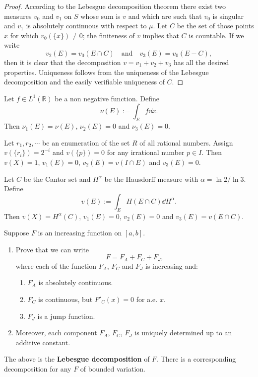 \begin{proof}
  According to the Lebesgue decomposition theorem there exist two measures $v_0$ and $v_1$ on $S$ 
  whose sum is $v$ and which are such that $v_0$ is singular 
  and $v_1$ is absolutely continuous with respect to $\mu$.
  Let $C$ be the set of those points $x$ for which $v_0(\{x\}) \neq 0$; the finiteness of $v$ implies that 
  $C$ is countable. If we write 
  \[
  v_2(E) = v_0(E\cap C) \quad \text{and}\quad v_3(E) = v_0(E-C),
  \]
  then it is clear that the decomposition $v = v_1 + v_2 + v_3$ has all the desired properties.
  Uniqueness follows from the uniqueness of the Lebesgue decomposition 
  and the easily verifiable uniqueness of $C$.
\end{proof}

\begin{example}
  Let $f\in L^1(\mathbb R)$ be a non negative function. 
  Define 
  \[
  \nu(E) := \int_Ef\dd x.
  \]
  Then $\nu_1(E) = \nu(E)$, $\nu_2(E) = 0$ and $\nu_3(E) = 0$.

  Let $r_1, r_2, \cdots$ be an enumeration of the set $R$ of all rational numbers. 
  Assign $v(\{r_i\}) = 2^{-i}$ and $v(\{p\}) = 0$ for any irrational number $p\in I$.
  Then $v(X) = 1$, $v_1(E) = 0$, $v_2(E) = v(I\cap E)$ and $v_3(E) = 0$.

  Let $C$ be the Cantor set and $H^{\alpha}$ be the Hausdorff measure with $\alpha=\ln 2/\ln3$.
  Define 
  \[
  v(E) := \int_E H(E\cap C)\dd H^\alpha.
  \]
  Then $v(X) = H^\alpha(C)$, $v_1(E) = 0$, $v_2(E) = 0$ and $v_3(E) = v(E\cap C)$.
\end{example}

\begin{example}
  \label{eg: Lebesgue decomposition of increasing function}
  Suppose $F$ is an increasing function on $[a,b]$.
  \begin{enumerate}
    \item Prove that we can write 
    \[
    F = F_A + F_C + F_J,
    \]
    where each of the function $F_A$, $F_C$ and $F_J$ is increasing and:
    \begin{enumerate}
      \item $F_A$ is absolutely continuous.
      \item $F_C$ is continuous, but $F'_C(x) = 0$ for a.e. $x$.
      \item $F_J$ is a jump function.
    \end{enumerate}
    \item Moreover, each component $F_A$, $F_C$, $F_J$ is uniquely determined up to an additive constant.
  \end{enumerate}
  The above is the \textbf{Lebesgue decomposition} of $F$. There is a corresponding decomposition for any $F$ of bounded variation.
\end{example}

